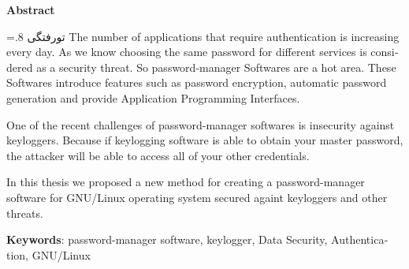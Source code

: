 


\pagestyle{empty}

\begin{latin}

\begin{center}
\textbf{Abstract}
\end{center}
\baselineskip=.8\baselineskip
{}‌تورفتگی
The number of applications that require authentication is increasing every day.  As we know choosing the same password for different services is considered as a security threat. So password-manager Softwares are a hot area. These Softwares introduce features such as password encryption, automatic password generation and provide Application Programming Interfaces.

One of the recent challenges of password-manager softwares is insecurity against keyloggers. Because if keylogging software is able to obtain your master password, the attacker will be able to access all of your other credentials.

In this thesis we proposed a new method for creating a password-manager software for GNU/Linux operating system secured againt keyloggers and other threats.

\bigskip\noindent\textbf{Keywords}:
password-manager software, keylogger, Data Security, Authentication, GNU/Linux

\end{latin}

\newpage
